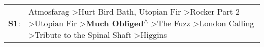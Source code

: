 \begin{supertabular}{p{0.03\textwidth}p{0.92\textwidth}}
 \textbf{S1}:  &  Atmosfarag\textsuperscript{} \textgreater \enspace Hurt Bird Bath\textsuperscript{}, \enspace Utopian Fir\textsuperscript{} \textgreater \enspace Rocker Part 2\textsuperscript{} \textgreater \enspace Utopian Fir\textsuperscript{} \textgreater \enspace \textbf{Much Obliged\textsuperscript{$\wedge$}} \textgreater \enspace The Fuzz\textsuperscript{} \textgreater \enspace London Calling\textsuperscript{} \textgreater \enspace Tribute to the Spinal Shaft\textsuperscript{} \textgreater \enspace Higgins\textsuperscript{}  \enspace  \\
\end{supertabular}
